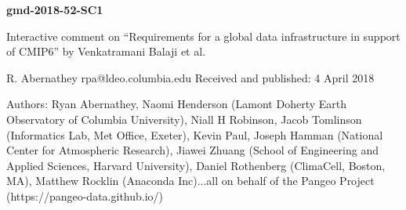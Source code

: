 \documentclass[gmd,manuscript]{copernicus}
\begin{document}




\pagebreak


\textbf{gmd-2018-52-SC1}

Interactive comment on “Requirements for a global data infrastructure
in support of CMIP6” by Venkatramani Balaji et al.

R. Abernathey
rpa@ldeo.columbia.edu
Received and published: 4 April 2018

Authors: Ryan Abernathey, Naomi Henderson (Lamont Doherty Earth Observatory of
Columbia University), Niall H Robinson, Jacob Tomlinson (Informatics Lab, Met Office,
Exeter), Kevin Paul, Joseph Hamman (National Center for Atmospheric Research), Jiawei Zhuang (School of Engineering and Applied Sciences, Harvard University), Daniel
Rothenberg (ClimaCell, Boston, MA), Matthew Rocklin (Anaconda Inc)...all on behalf
of the Pangeo Project (https://pangeo-data.github.io/)
\end{document}
